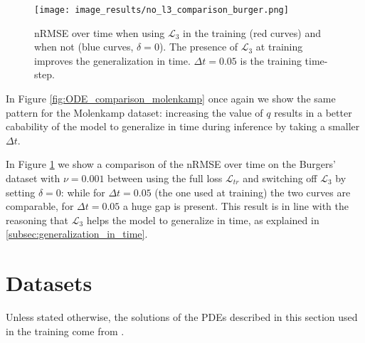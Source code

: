 \begin{figure}
  \centering
  \texttt{[image: image\_results/no\_l3\_comparison\_burger.png]}
  \caption{nRMSE over time when using $\mathcal{L}_3$ in the training (red curves) and when not (blue curves, $\delta=0$). The presence of $\mathcal{L}_3$ at training improves the generalization in time. $\Delta t = 0.05$ is the training time-step.} 
  \label{fig:no_l3_burger}
\end{figure}
In Figure \ref{fig:ODE_comparison_molenkamp} once again we show the same pattern for the Molenkamp dataset: increasing the value of $q$ results in a better cabability of the model to generalize in time during inference by taking a smaller $\Delta t$.


In Figure \ref{fig:no_l3_burger} we show a comparison of the nRMSE over time on the Burgers' dataset with $\nu=0.001$ between using the full loss $\mathcal{L}_{tr}$ and switching off $\mathcal{L}_3$ by setting $\delta=0$: while for $\Delta t =0.05$ (the one used at training) the two curves are comparable, for $\Delta t =0.05$ a huge gap is present. This result is in line with the reasoning that $\mathcal{L}_3$ helps the model to generalize in time, as explained in \ref{subsec:generalization_in_time}.
\section{Datasets}
\label{subsec:datasets}
Unless stated otherwise, the solutions of the PDEs described in this section used in the training come from \cite{takamoto2022pdebench}.
